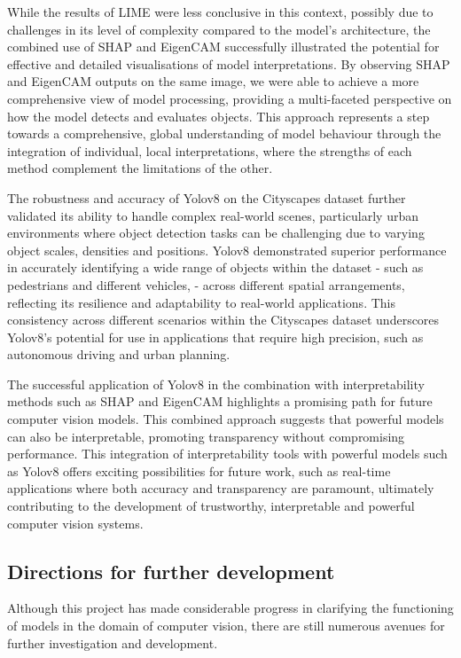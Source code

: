 While the results of LIME  were less conclusive in this context, possibly due to challenges in its level of complexity compared to the model's architecture, the combined use of SHAP and EigenCAM successfully illustrated the potential for effective and detailed visualisations of model interpretations.
By observing SHAP and EigenCAM outputs on the same image, we were able to achieve a more comprehensive view of model processing, providing a multi-faceted perspective on how the model detects and evaluates objects.
This approach represents a step towards a comprehensive, global understanding of model behaviour through the integration of individual, local interpretations, where the strengths of each method complement the limitations of the other.

The robustness and accuracy of Yolov8 on the Cityscapes dataset further validated its ability to handle complex real-world scenes, particularly urban environments where object detection tasks can be challenging due to varying object scales, densities and positions. Yolov8 demonstrated superior performance in accurately identifying a wide range of objects within the dataset - such as pedestrians and different vehicles, - across different spatial arrangements, reflecting its resilience and adaptability to real-world applications.
This consistency across different scenarios within the Cityscapes dataset underscores Yolov8's potential for use in applications that require high precision, such as autonomous driving and urban planning.

The successful application of Yolov8 in the combination with interpretability methods such as SHAP and EigenCAM highlights a promising path for future computer vision models.
This combined approach suggests that powerful models can also be interpretable, promoting transparency without compromising performance.
This integration of interpretability tools with powerful models such as Yolov8 offers exciting possibilities for future work, such as real-time applications where both accuracy and transparency are paramount, ultimately contributing to the development of trustworthy, interpretable and powerful computer vision systems.

\subsection{Directions for further development}\label{subsec:dircetions-for-further-development}

Although this project has made considerable progress in clarifying the functioning of models in the domain of computer vision, there are still numerous avenues for further investigation and development.

